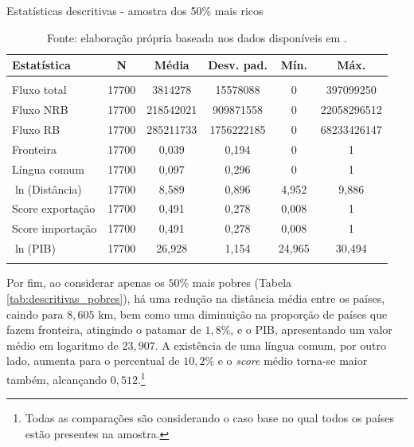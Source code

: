 \begin{table}[H] \centering 
	\caption{Estatísticas descritivas - amostra dos 50\% mais ricos} 
	\label{tab:descritivas_ricos} 
	\begin{tabular}{@{\extracolsep{5pt}}lccccc} 
		\\[-1.8ex]\toprule 
		Estatística & \multicolumn{1}{c}{N} & \multicolumn{1}{c}{Média} & \multicolumn{1}{c}{Desv. pad.} & \multicolumn{1}{c}{Mín.} &  \multicolumn{1}{c}{Máx.} \\ 
		\midrule \\[-1.8ex] 
		Fluxo total & 17700 & 3814278 & 15578088 & 0 &  397099250 \\ 
		Fluxo NRB & 17700 & 218542021 & 909871558 & 0 & 22058296512 \\ 
		Fluxo RB & 17700 & 285211733 & 1756222185 & 0 &  68233426147 \\ 
		Fronteira & 17700 & 0,039 & 0,194 & 0 & 1 \\ 
		Língua comum & 17700 & 0,097 & 0,296 & 0 & 1 \\ 
		$\ln$(Distância) & 17700 & 8,589 & 0,896 & 4,952 & 9,886 \\ 
		Score exportação & 17700 & 0,491 & 0,278 & 0,008 &  1 \\ 
		Score importação & 17700 & 0,491 & 0,278 & 0,008 &  1 \\ $\ln$(PIB) & 17700 & 26,928 & 1,154 & 24,965 & 30,494\\
		\bottomrule \\[-1.8ex] 
	\end{tabular} 
\caption*{\RaggedRight  Fonte: elaboração própria baseada nos dados disponíveis em \cite{Cepii2019, Comtrade2019, WorldBank2019}.}
\end{table} 
Por fim, ao considerar apenas os $50\%$ mais pobres (Tabela \ref{tab:descritivas_pobres}), há uma redução na distância média entre os países, caindo para $8,605$ km, bem como uma diminuição na proporção de países que fazem fronteira, atingindo o patamar de $1,8\%$, e o PIB, apresentando um valor médio em logaritmo de $23,907$. A existência de uma língua comum, por outro lado, aumenta para o percentual de $10,2\%$ e o \textit{score} médio torna-se maior também, alcançando $0,512$.\footnote{Todas as comparações são considerando o caso base no qual todos os países estão presentes na amostra.}

